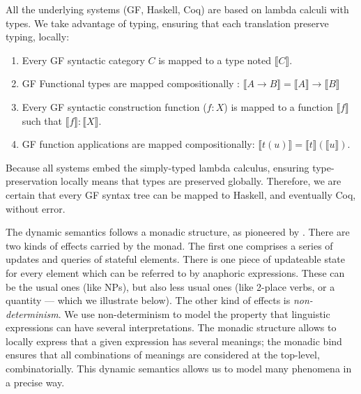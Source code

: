 \documentclass[11pt]{article}
\begin{document}




All the underlying systems (GF, Haskell, Coq) are based on lambda
calculi with types. We take advantage of typing, ensuring that each
translation preserve typing, locally:
\begin{enumerate}[noitemsep]
\item Every GF syntactic category $C$ is mapped to a type noted $⟦C⟧$.
\item GF Functional types are mapped compositionally : $⟦A → B⟧ = ⟦A⟧ → ⟦B⟧$
\item Every GF syntactic construction function ($f : X$) is mapped to a function $⟦f⟧$ such that $⟦f⟧ : ⟦X⟧$.
\item GF function applications are mapped compositionally: $⟦t(u)⟧ = ⟦t⟧ (⟦u⟧)$.
\end{enumerate}
Because all systems embed the simply-typed lambda calculus, ensuring
type-preservation locally means that types are preserved globally.
Therefore, we are certain that every GF syntax tree can be mapped to
Haskell, and eventually Coq, without error.

The dynamic semantics follows a monadic structure, as pioneered by
\citet{Shan:2002}. There are two kinds of effects carried by the
monad.  The first one comprises a series of updates and queries of
stateful elements.  There is one piece of updateable state for every
element which can be referred to by anaphoric expressions. These can
be the usual ones (like NPs), but also less usual ones (like 2-place
verbs, or a quantity --- which we illustrate below). The other kind of
effects is \emph{non-determinism}. We use non-determinism to model the
property that linguistic expressions can have several
interpretations. The monadic structure allows to locally express that
a given expression has several meanings; the monadic bind ensures that
all combinations of meanings are considered at the top-level,
combinatorially. This dynamic semantics allows us to model many
phenomena in a precise way.
\end{document}
